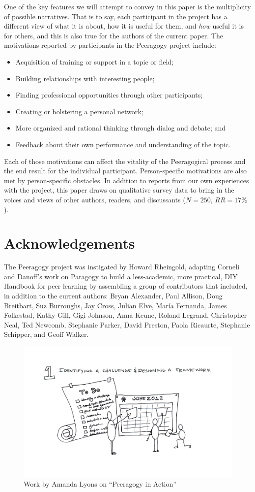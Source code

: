 \documentclass{acm_proc_article-sp}
\begin{document}
One of the key features we will attempt to convey in this paper is the multiplicity of possible narratives.  That is to say, each participant in the project has a different view of what it is about, how it is useful for them, and \emph{how} useful it is for others, and this is also true for the authors of the current paper. The motivations reported by participants in the Peeragogy project include:
\begin{itemize}
\item Acquisition of training or support in a topic or field;
\item Building relationships with interesting people;
\item Finding professional opportunities through other participants;
\item Creating or bolstering a personal network;
\item More organized and rational thinking through dialog and debate; and
\item Feedback about their own performance and understanding of the
  topic.
\end{itemize}

Each of those motivations can affect the vitality of the Peeragogical process and the end result for the individual participant. Person-specific motivations are also met by person-specific obstacles. In addition to reports from our own experiences with the project, this paper draws on qualitative survey data to bring in the voices and views of other authors, readers, and discussants ($N=250$, $RR=17\%$).

\section{Acknowledgements}

The Peeragogy project was instigated by Howard Rheingold, adapting Corneli and Danoff's \cite{paragogy} work on Paragogy to build a
less-academic, more practical, DIY Handbook for peer learning by assembling a group of contributors that included, in addition to the current authors: Bryan Alexander, Paul Allison, Doug Breitbart, Suz Burroughs, Jay Cross, Julian Elve, Mar\'ia Fernanda, James Folkestad, Kathy Gill, Gigi Johnson, Anna Keune, Roland Legrand, Christopher Neal, Ted Newcomb, Stephanie Parker, David Preston, Paola Ricaurte, Stephanie Schipper, and Geoff Walker.

\begin{figure}
\begin{center}
\includegraphics[width=.5\textwidth]{OpenBook1.jpg}
\vspace{-.7in}
\end{center}
\caption{Work by Amanda Lyons on ``Peeragogy in Action''
  \cite{PeeragogyinAction} \label{amanda}}
\end{figure}
\end{document}
